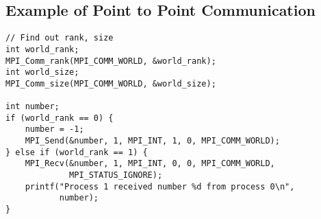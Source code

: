 \subsection*{Example of Point to Point Communication}

\begin{verbatim}
// Find out rank, size
int world_rank;
MPI_Comm_rank(MPI_COMM_WORLD, &world_rank);
int world_size;
MPI_Comm_size(MPI_COMM_WORLD, &world_size);

int number;
if (world_rank == 0) {
    number = -1;
    MPI_Send(&number, 1, MPI_INT, 1, 0, MPI_COMM_WORLD);
} else if (world_rank == 1) {
    MPI_Recv(&number, 1, MPI_INT, 0, 0, MPI_COMM_WORLD,
             MPI_STATUS_IGNORE);
    printf("Process 1 received number %d from process 0\n",
           number);
}
\end{verbatim}


